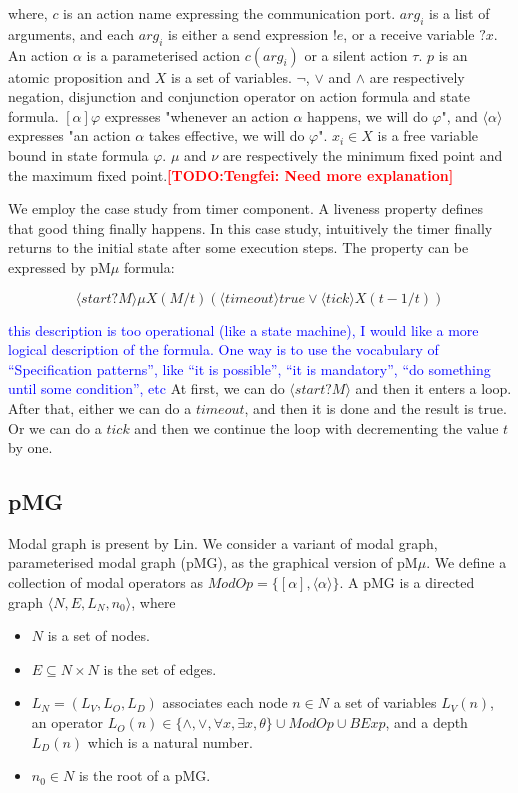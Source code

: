 \documentclass[runningheads,a4paper]{llncs}
\newcommand{\TODO}[1]{\textcolor{red}{\textbf{[TODO:#1]}}}
\newcommand{\ERIC}[1]{\textcolor{blue}{#1}}
\begin{document}
 where, $c$ is an action name expressing the communication port. $arg_{i}$ is a list of arguments, and each $arg_{i}$ is either a send expression $!e$, or a receive variable $?x$. An action $\alpha$ is a parameterised action $c(arg_{i})$ or a silent action $\tau$. $p$ is an atomic proposition and $X$ is a set of variables. $\neg$, $\vee$ and $\wedge$ are respectively negation, disjunction and conjunction operator on action formula and state formula. $[\alpha]\varphi$ expresses "whenever an action $\alpha$ happens, we will do $\varphi$", and $\langle\alpha\rangle$ expresses "an action $\alpha$ takes effective, we will do $\varphi$". $x_{i}\in X$ is a free variable bound in state formula $\varphi$. $\mu$ and $\nu$ are respectively the minimum fixed point and the maximum fixed point.\TODO{Tengfei: Need more explanation}

 
 
We employ the case study from timer component\cite{mavridou2016architectrue}. A liveness property defines that good thing finally happens. In this case study, intuitively the timer finally returns to the initial state after some execution steps. The property can be expressed by pM$\mu$ formula:

\begin{equation}\label{formula1}
	\langle start?M\rangle\mu X(M/t)(\langle timeout\rangle true \vee \langle tick\rangle X(t-1/t))
\end{equation}

\ERIC{this description is too operational (like a state machine), I would like a more logical description of the formula. One way is to use the vocabulary of ``Specification patterns'', like ``it is possible'', ``it is mandatory'', ``do something until some condition'', etc}
At first, we can do $\langle start?M\rangle$ and then it enters a loop. After that, either we can do a $timeout$, and then it is done and the result is true. Or we can do a $tick$ and then we continue the loop with decrementing the value $t$ by one. 


\subsection{pMG}

Modal graph is present by Lin\cite{lin2001modal}. We consider a variant of modal graph, parameterised modal graph (pMG), as the graphical version of pM$\mu$. We define a collection of modal operators as $ModOp = \{[\alpha], \langle\alpha\rangle\}$. A pMG is a directed graph $\langle N, E, L_{N}, n_{0}\rangle$, where
\begin{itemize}
	\item $N$ is a set of nodes.
	\item $E \subseteq N\times N$ is the set of edges.
	\item $L_{N} = (L_{V}, L_{O}, L_{D})$ associates each node $n\in N$ a set of variables $L_{V}(n)$, an operator $L_{O}(n)\in\{\wedge, \vee, \forall x, \exists x, \theta\}\cup ModOp \cup BExp$, and a depth $L_{D}(n)$ which is a natural number.
	\item $n_{0} \in N$ is the root of a pMG.
\end{itemize}
\end{document}
